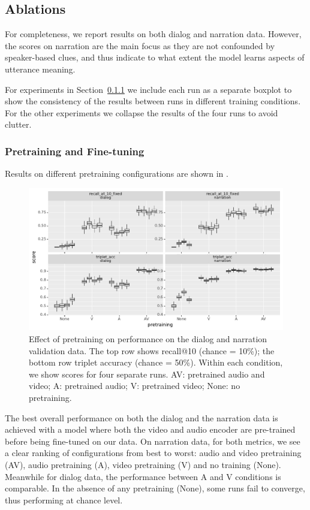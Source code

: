 \subsection{Ablations}
\label{sec:ablations}
For completeness, we report results on both dialog and narration
data. However, the scores on narration are the main focus as they are
not confounded by speaker-based clues, and thus indicate to what
extent the model learns aspects of utterance meaning.

For experiments in Section~\ref{sec:pretraining} we include each run as a separate boxplot
to show the consistency of the results between runs in
different training conditions.  For the other experiments we collapse
the results of the four runs to avoid clutter.

\subsubsection{Pretraining and Fine-tuning}
\label{sec:pretraining}

Results on different pretraining configurations are shown in
.
\begin{figure}[htb]
	\centering
	\includegraphics[width=\textwidth]{results/ablations/pretraining.pdf}
	\caption{Effect of pretraining on performance on the dialog
          and narration validation data. The top row shows recall@10
          (chance = 10\%); the bottom row triplet accuracy (chance =
          50\%). Within each condition, we show scores for four
          separate runs. AV: pretrained audio and video; A: pretrained
          audio; V: pretrained video; None: no pretraining.}
	\label{fig:pretraining}
      \end{figure}

The best overall performance on both the dialog and the narration data is 
achieved with a model where both the video and audio encoder are pre-trained 
before being fine-tuned on our data. On narration data, for both metrics,
we see a clear ranking of
configurations from best to worst: audio and video pretraining (AV), 
audio pretraining (A), video pretraining (V) and no training (None). 
Meanwhile for dialog data, the performance between A and V conditions
is comparable. In the absence of any pretraining (None),
some runs fail to converge, thus performing at chance level.

